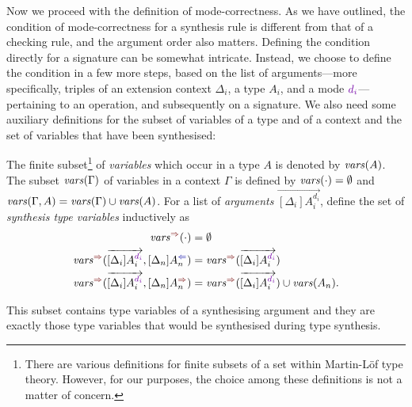 Now we proceed with the definition of mode-correctness.
As we have outlined, the condition of mode-correctness for a synthesis rule is different from that of a checking rule, and the argument order also matters.
Defining the condition directly for a signature can be somewhat intricate.
Instead, we choose to define the condition in a few more steps, based on the list of arguments---more specifically, triples of an extension context $\Delta_i$, a type $A_i$, and a mode $\dir{d_i}$---pertaining to an operation, and subsequently on a signature.
We also need some auxiliary definitions for the subset of variables of a type and of a context and the set of variables that have been synthesised:
\begin{definition}
  The finite subset\footnote{%
  There are various definitions for finite subsets of a set within Martin-L\"{o}f type theory.
  However, for our purposes, the choice among these definitions is not a matter of concern.}
  of \emph{variables} which occur in a type $A$ is denoted by $\mathit{vars}(A)$.
  The subset $\mathit{vars}(\Gamma)$ of variables in a context $\Gamma$ is defined by $\mathit{vars}(\cdot) = \emptyset$ and $\mathit{vars}(\Gamma, A) = \mathit{vars}(\Gamma) \cup \mathit{vars}(A)$.
  For a list of \emph{arguments} $\overrightarrow{[\Delta_i]A_i^{d_i}}$, define the set of \emph{synthesis type variables} inductively as 
  \begin{align}
    \label{eq:synvar1}\synvar(\cdot)                                  & = \emptyset  \\
    \label{eq:synvar2}\synvar(\overrightarrow{[\Delta_i]A_i^{\dir{d_i}}}, [\Delta_{n}] A_{n}^{\dir{\chk}}) & = 
    \synvar(\overrightarrow{[\Delta_i]A_i^{\dir{d_i}}}) \\
    \label{eq:synvar3}\synvar(\overrightarrow{[\Delta_i]A_i^{\dir{d_i}}}, [\Delta_{n}] A_{n}^{\dir{\syn}}) & = 
    \synvar(\overrightarrow{[\Delta_i]A_i^{\dir{d_i}}}) \cup \fv(A_{n}).
  \end{align}
\end{definition}
This subset contains type variables of a synthesising argument and they are exactly those type variables that would be synthesised during type synthesis.

